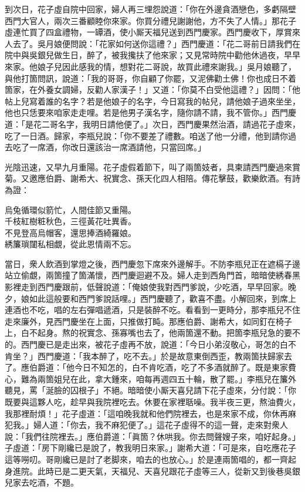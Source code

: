 到次日，花子虛自院中回家，婦人再三埋怨說道：「你在外邊貪酒戀色，多虧隔壁西門大官人，兩次三番顧睦你來家。你買分禮兒謝謝他，方不失了人情。」那花子虛連忙買了四盒禮物，一罈酒，使小厮天福兒送到西門慶家。西門慶收下，厚賞來人去了。吳月娘便問說：「花家如何送你這禮？」西門慶道：「花二哥前日請我們在院中與吳銀兒做生日，醉了，被我攙扶了他來家；又見常時院中勸他休過夜，早早來家。他娘子兒因此感我的情，想對花二哥說，故買此禮來謝我。」{}吳月娘聽了，與他打箇問訊，說道：「我的哥哥，你自顧了你罷，又泥佛勸土佛！你也成日不着箇家，在外養女調婦，反勸人家漢子！」又道：「你莫不白受他這禮？」因問：「他帖上兒寫着誰的名字？若是他娘子的名字，今日寫我的帖兒，請他娘子過來坐坐，他也只恁要來咱家走走哩。{}若是他男子漢名字，隨你請不請，我不管你。」西門慶道：「是花二哥名字，我明日請他便了。」次日，西門慶果然治酒，請過花子虛來，吃了一日酒。歸家，李瓶兒說：「你不要差了禮數。咱送了他一分禮，他到請你過去吃了一席酒，你改日還該治一席酒請他，只當回席。」

光陰迅速，又早九月重陽。花子虛假着節下，叫了兩箇妓者，具柬請西門慶過來賞菊。又邀應伯爵、謝希大、祝實念、孫天化四人相陪。傳花擊鼓，歡樂飲酒。有詩為證：

\begin{myquote}
烏兔循環似箭忙，人間佳節又重陽。\\千枝紅樹粧秋色，三徑黃花吐異香。\\不見登高烏帽客，還思捧酒綺羅娘。\\綉簾瑣闥私相覷，從此恩情兩不忘。
\end{myquote}

當日，衆人飲酒到掌燈之後，西門慶忽下席來外邊解手。不防李瓶兒正在遮槅子邊站立偷覷，兩箇撞了箇滿懷，{}西門慶迴避不及。婦人走到西角門首，暗暗使綉春黑影裡走到西門慶跟前，低聲說道：「俺娘使我對西門爹說，少吃酒，早早回家。晚夕，娘如此這般要和西門爹說話哩。」西門慶聽了，歡喜不盡。小解回來，到席上連酒也不吃，唱的左右彈唱遞酒，只是裝醉不吃。看看到一更時分，那李瓶兒不住走來廉外，見西門慶坐在上面，只推做打盹。那應伯爵、謝希大，如同釘在椅子上，白不起身。熬的祝實念、孫寡嘴也去了，他兩箇還不動。把箇李瓶兒急的要不的。西門慶已是走出來，被花子虛再不放，說道：「今日小弟沒敬心，哥怎的白不肯坐？」西門慶道：「我本醉了，吃不去。」於是故意東倒西歪，教兩箇扶歸家去了。應伯爵道：「他今日不知怎的，白不肯吃酒，吃了不多酒就醉了。既是東家費心，難為兩箇姐兒在此，拿大鍾來，咱每再週四五十輪，散了罷。」李瓶兒在簾外聽見，罵「涎臉的囚根子」不絕。暗暗使小厮天喜兒請下花子虛來，分付說：「你既要與這夥人吃，趁早與我院裡吃去。休要在家裡聒噪。我半夜三更，熬油費火，我那裡耐煩！」花子虛道：「這咱晚我就和他們院裡去，也是來家不成，你休再麻犯我。」婦人道：「你去，我不麻犯便了。」這花子虛得不的這一聲，走來對衆人說：「我們往院裡去。」應伯爵道：「眞箇？休哄我。你去問聲嫂子來，咱好起身。」子虛道：「房下剛纔已是說了，教我明日來家。」謝希大道：「可是來，自吃應花子這等嘮叨。哥剛纔已是討了老脚來，咱去的也放心。」於是連兩箇唱的，都一齊起身進院。此時已是二更天氣，天福兒、天喜兒跟花子虛等三人，從新又到後巷吳銀兒家去吃酒，不題。

